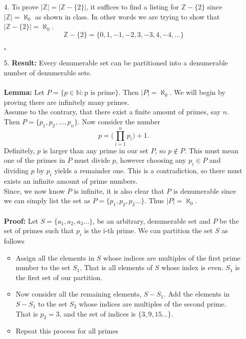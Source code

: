 \documentclass[12pt]{article}
\newcommand{\N}{\mathbb{N}}
\newcommand{\Z}{\mathbb{Z}}
\begin{document}
\begin{enumerate}
    \item[4. ]To prove $|\Z|=|\Z-\{2\}|$, it suffices to find a listing for $\Z-\{2\}$ since $|\Z|=\aleph_0$ as shown in class. In other words we are trying to show that 
    $|\Z-\{2\}| = \aleph_0$. 
    $$\Z-\{2\}=\{0,1,-1,-2,3,-3,4,-4,...\} $$
    \\ $\square$
    
    \item[5. ]\textbf{Result: }Every denumerable set can be partitioned into a denumerable number
    of denumerable sets. \\ \\ 
    \textbf{Lemma: }Let $P=\{p\in\N: \text{p is prime}\}.$ Then $|P|=\aleph_0$. We will begin by proving there are infinitely many primes. \\
    Assume to the contrary, that there exist a finite amount of primes, say $n$. Then $P=\{p_1, p_2,...,p_n\}.$ 
    Now consider the number
    $$p={(\displaystyle \prod_{i=1}^{n} p_{i}})+1.$$ Definitely, $p$ is larger than any prime in our set $P$, so $p\notin P$. This must mean one of the primes in $P$ must divide $p$, however choosing any $p_i\in P$ and dividing $p$ by $p_i$ yields a remainder one. This is a contradiction, so there must exists an infinite amount of prime numbers. \\
    Since, we now know $P$ is infinite, it is also clear that $P$ is denumerable since we can simply list the set as $P=\{p_1,p_2,p_3...\}$. Thus $|P|=\aleph_0$.\\ \\
    \textbf{Proof: }Let $ S = \{ a_1, a_2, a_3...\}$, be an arbitrary, denumerable set and $P$ be the set of primes such that $p_i$ is the i-th prime. We can partition the set $S$ as follows
    \begin{itemize}
        \item Assign all the elements in $S$ whose indices are multiples of the first prime number to the set $S_1$. That is all elements of $S$ whose index is even. $S_1$ is the first set of our partition.
        \item Now consider all the remaining elements, $S-S_1$. Add the elements in $S-S_1$ to the set $S_2$ whose indices are multiples of the second prime. That is $p_2=3$, and the set of indices is $\{3,9,15...\}$.
        \item Repeat this process for all primes
    \end{itemize}

\end{enumerate}
\end{document}
